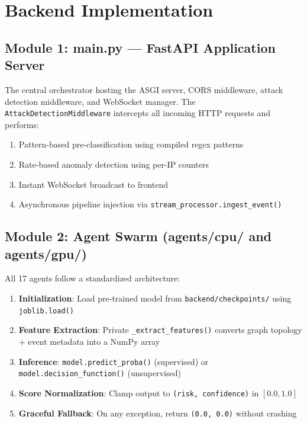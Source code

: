 \documentclass[12pt, a4paper]{report}
\begin{document}
\section{Backend Implementation}

\subsection{Module 1: main.py — FastAPI Application Server}

The central orchestrator hosting the ASGI server, CORS middleware, attack detection middleware, and WebSocket manager. The \texttt{AttackDetectionMiddleware} intercepts all incoming HTTP requests and performs:
\begin{enumerate}
    \item Pattern-based pre-classification using compiled regex patterns
    \item Rate-based anomaly detection using per-IP counters
    \item Instant WebSocket broadcast to frontend
    \item Asynchronous pipeline injection via \texttt{stream\_processor.ingest\_event()}
\end{enumerate}

\subsection{Module 2: Agent Swarm (agents/cpu/ and agents/gpu/)}

All 17 agents follow a standardized architecture:
\begin{enumerate}
    \item \textbf{Initialization}: Load pre-trained model from \texttt{backend/checkpoints/} using \texttt{joblib.load()}
    \item \textbf{Feature Extraction}: Private \texttt{\_extract\_features()} converts graph topology + event metadata into a NumPy array
    \item \textbf{Inference}: \texttt{model.predict\_proba()} (supervised) or \texttt{model.decision\_function()} (unsupervised)
    \item \textbf{Score Normalization}: Clamp output to \texttt{(risk, confidence)} in $[0.0, 1.0]$
    \item \textbf{Graceful Fallback}: On any exception, return \texttt{(0.0, 0.0)} without crashing
\end{enumerate}
\end{document}
